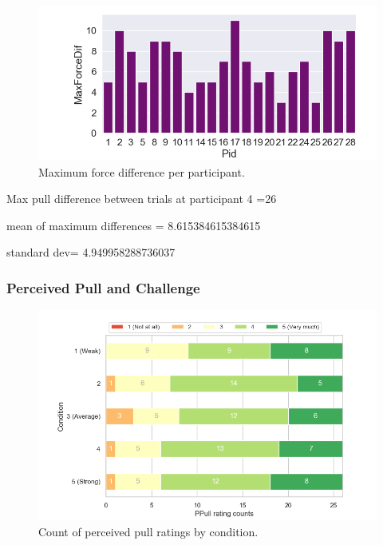 \begin{figure}[H]
\hspace{-30mm}
 \centering
 \includegraphics[scale=0.7]{Files/Plots/max_force_dif.png}
 \caption{Maximum force difference per participant.}
\label{fig:forceDif}
\end{figure} 

Max pull difference between trials at  participant 4 =26

mean of maximum differences = 8.615384615384615

standard dev= 4.949958288736037

 \clearpage   

\subsubsection{Perceived Pull and Challenge}
\label{subsubsection:ppullChallenge}
  
\begin{figure}[H]
\centering
\captionsetup{justification=centering,margin=0.1cm}
\hspace{-20mm}
\includegraphics[scale=0.7]{Files/Plots/ppull_by_condition_count_stacked.png}
\caption{Count of perceived pull ratings by condition.}
\label{fig:ppullStacked}
\end{figure}
\vspace{-5mm}

